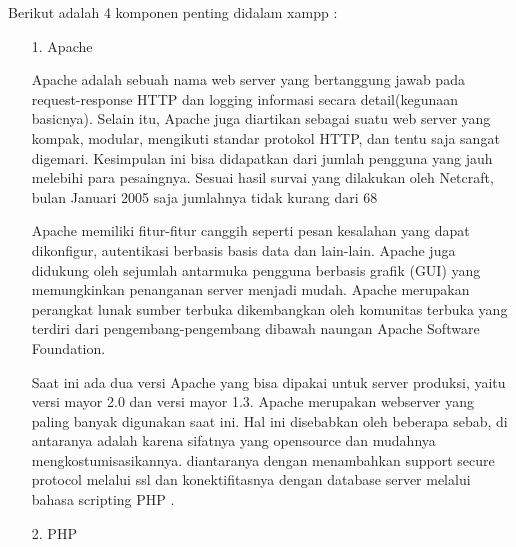 \documentclass{jtetiproposalskripsi}
\begin{document}
Berikut adalah 4 komponen penting didalam xampp :

\begin{itemize}
\item[1.]Apache

Apache adalah sebuah nama web server yang bertanggung jawab pada request-response HTTP dan logging informasi secara detail(kegunaan basicnya). Selain itu, Apache juga diartikan sebagai suatu web server yang kompak, modular, mengikuti standar protokol HTTP, dan tentu saja sangat digemari. Kesimpulan ini bisa didapatkan dari jumlah pengguna yang jauh melebihi para pesaingnya. Sesuai hasil survai yang dilakukan oleh Netcraft, bulan Januari 2005 saja jumlahnya tidak kurang dari 68%

Apache memiliki fitur-fitur canggih seperti pesan kesalahan yang dapat dikonfigur, autentikasi berbasis basis data dan lain-lain. Apache juga didukung oleh sejumlah antarmuka pengguna berbasis grafik (GUI) yang memungkinkan penanganan server menjadi mudah. Apache merupakan perangkat lunak sumber terbuka dikembangkan oleh komunitas terbuka yang terdiri dari pengembang-pengembang dibawah naungan Apache Software Foundation.

Saat ini ada dua versi Apache yang bisa dipakai untuk server produksi, yaitu versi mayor 2.0 dan versi mayor 1.3. Apache merupakan webserver yang paling banyak digunakan saat ini. Hal ini disebabkan oleh beberapa sebab, di antaranya adalah karena sifatnya yang opensource dan mudahnya mengkostumisasikannya. diantaranya dengan menambahkan support secure protocol melalui ssl dan konektifitasnya dengan database server melalui bahasa scripting PHP .


\item[2.] PHP 


\end{itemize}
\end{document}

